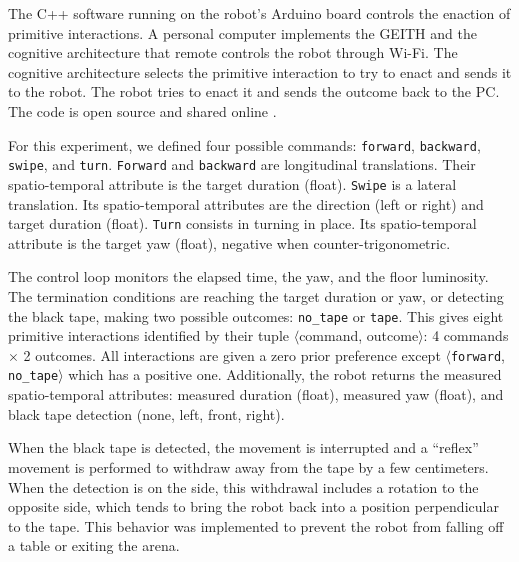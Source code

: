 \documentclass[runningheads]{llncs}
\begin{document}
The C++ software running on the robot's Arduino board controls the enaction of primitive interactions. 
A personal computer implements the GEITH and the cognitive architecture that remote controls the robot through Wi-Fi.
The cognitive architecture selects the primitive interaction to try to enact and sends it to the robot. 
The robot tries to enact it and sends the outcome back to the PC.  
The code is open source and shared online \cite{petitcat_github}.

For this experiment, we defined four possible commands: \texttt{forward}, \texttt{backward}, \texttt{swipe}, and \texttt{turn}. 
\texttt{Forward} and \texttt{backward} are longitudinal translations. Their spatio-temporal attribute is the target duration (float).   
\texttt{Swipe} is a lateral translation. Its spatio-temporal attributes are the direction (left or right) and target duration (float). 
\texttt{Turn} consists in turning in place. Its spatio-temporal attribute is the target yaw (float), negative when counter-trigonometric. 

The control loop monitors the elapsed time, the yaw, and the floor luminosity. %
The termination conditions are reaching the target duration or yaw, or detecting the black tape, making two possible outcomes: \texttt{no\_tape} or \texttt{tape}.
This gives eight primitive interactions identified by their tuple $\langle$command, outcome$\rangle$: 4 commands $\times$ 2 outcomes.
All interactions are given a zero prior preference except $\langle$\texttt{forward}, \texttt{no\_tape}$\rangle$ which has a positive one.
Additionally, the robot returns the measured spatio-temporal attributes: measured duration (float), measured yaw (float), and black tape detection (none, left, front, right). 

When the black tape is detected, the movement is interrupted and a ``reflex'' movement is performed to withdraw away from the tape by a few centimeters. 
When the detection is on the side, this withdrawal includes a rotation to the opposite side, which tends to bring the robot back into a position perpendicular to the tape. This behavior was implemented to prevent the robot from falling off a table or exiting the arena.
\end{document}
